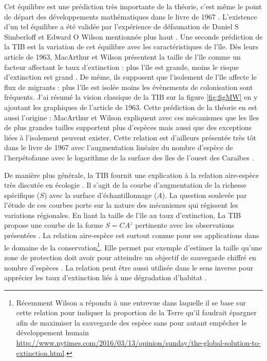 Cet équilibre est une prédiction très importante de la théorie, c'est
même le point de départ des développements mathématiques dans le livre
de 1967 \citep{MacArthur1967}. L'existence d'un tel équilibre a été
validée par l'expérience de défaunation de Daniel S Simberloff et Edward
O Wilson mentionnée plus haut \citep{Simberloff1969}. Une seconde
prédiction de la TIB est la variation de cet équilibre avec les
caractéristiques de l'île. Dès leurs article de 1963, MacArthur et
Wilson présentent la taille de l'île comme un facteur affectant le taux
d'extinction : plus l'île est grande, moins le risque d'extinction est
grand \citep{MacArthur1963}. De même, ils supposent que l'isolement de
l'île affecte le flux de migrants : plus l'île est isolée moins les
évènements de colonisation sont fréquents. J'ai résumé la vision
classique de la TIB sur la figure \ref{fig:figMW} en y ajoutant les
graphiques de l'article de 1963. Cette prédiction de la théorie en est
aussi l'origine : MacArthur et Wilson expliquent avec ces mécanismes que
les îles de plus grandes tailles supportent plus d'espèces mais aussi
que des exceptions liées à l'isolement peuvent exister. Cette relation
est d'ailleurs présentée très tôt dans le livre de 1967 avec
l'augmentation linéaire du nombre d'espèce de l'herpétofaune avec le
logarithme de la surface des îles de l'ouest des Caraïbes
\citep[chapitre 2]{MacArthur1967}.

De manière plus générale, la TIB fournit une explication à la relation
aire-espèce très discutée en écologie \citep{Lomolino2000a}. Il s'agit
de la courbe d'augmentation de la richesse spécifique (\(S\)) avec la
surface d'échantillonnage (\(A\)). La question soulevée par l'étude de
ces courbes porte sur la nature des mécanismes qui régissent les
variations régionales. En liant la taille de l'île au taux d'extinction,
La TIB propose une courbe de la forme \(S=CA^z\) pertinente avec les
observations présentées \citep{MacArthur1967}. La relation aire-espèce
est surtout connue pour ses applications dans le domaine de la
conservation\footnote{Récemment Wilson a répondu à une entrevue dans
  laquelle il se base sur cette relation pour indiquer la proportion de
  la Terre qu'il faudrait épargner afin de maximiser la sauvegarde des
  espèce sans pour autant empêcher le développement humain
  \url{http://www.nytimes.com/2016/03/13/opinion/sunday/the-global-solution-to-extinction.html}.}.
Elle permet par exemple d'estimer la taille qu'une zone de protection
doit avoir pour atteindre un objectif de sauvegarde chiffré en nombre
d'espèces \citep{Neigel2003, Desmet2004}. La relation peut être aussi
utilisée dans le sens inverse pour apprécier les taux d'extinction liés
à une dégradation d'habitat \citep{He2011}.

